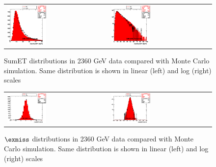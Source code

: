 \begin{figure}[h!]
 \centering
 \begin{tabular}{ll}
  \includegraphics[width=0.40\textwidth]{plots_DataVsMC_MB_2360GeV/h_caloSumet_lin.eps} &
  \includegraphics[width=0.40\textwidth]{plots_DataVsMC_MB_2360GeV/h_caloSumet.eps} \\
 \end{tabular}
 \caption{SumET distributions in 2360 GeV data compared
   with Monte Carlo simulation. Same distribution is shown in linear (left) and log (right) scales
          \label{fig:DataVsMC_MB_2360_2}}
\end{figure}

\begin{figure}[h!]
 \centering
 \begin{tabular}{ll}
  \includegraphics[width=0.40\textwidth]{plots_DataVsMC_MB_2360GeV/h_calometPx_lin.eps} &
  \includegraphics[width=0.40\textwidth]{plots_DataVsMC_MB_2360GeV/h_calometPx.eps} \\
 \end{tabular}
 \caption{$\exmiss$ distributions in 2360 GeV data compared
   with Monte Carlo simulation. Same distribution is shown in linear (left) and log (right) scales
          \label{fig:DataVsMC_MB_2360_3}}
\end{figure}

